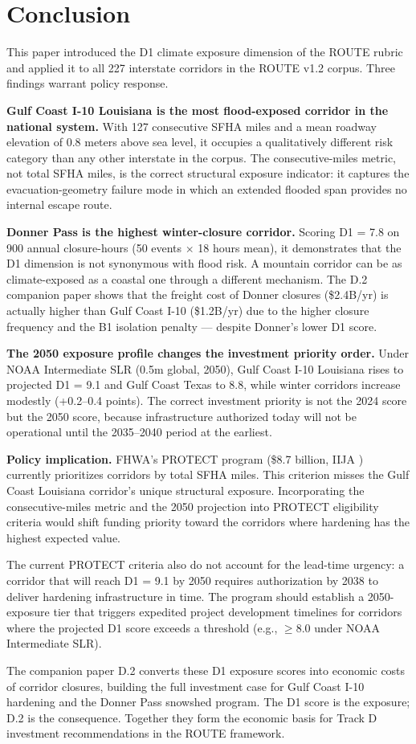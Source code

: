 \section{Conclusion}

This paper introduced the D1 climate exposure dimension of the ROUTE rubric and applied
it to all 227 interstate corridors in the ROUTE v1.2 corpus. Three findings warrant
policy response.

\textbf{Gulf Coast I-10 Louisiana is the most flood-exposed corridor in the national
system.} With 127 consecutive SFHA miles and a mean roadway elevation of 0.8 meters
above sea level, it occupies a qualitatively different risk category than any other
interstate in the corpus. The consecutive-miles metric, not total SFHA miles, is the
correct structural exposure indicator: it captures the evacuation-geometry failure mode
in which an extended flooded span provides no internal escape route.

\textbf{Donner Pass is the highest winter-closure corridor.} Scoring D1 = 7.8 on 900
annual closure-hours (50 events $\times$ 18 hours mean), it demonstrates that the D1
dimension is not synonymous with flood risk. A mountain corridor can be as climate-exposed
as a coastal one through a different mechanism. The D.2 companion paper shows that the
freight cost of Donner closures (\$2.4B/yr) is actually higher than Gulf Coast I-10
(\$1.2B/yr) due to the higher closure frequency and the B1 isolation penalty --- despite
Donner's lower D1 score.

\textbf{The 2050 exposure profile changes the investment priority order.} Under NOAA
Intermediate SLR (0.5m global, 2050), Gulf Coast I-10 Louisiana rises to projected D1 =
9.1 and Gulf Coast Texas to 8.8, while winter corridors increase modestly (+0.2--0.4
points). The correct investment priority is not the 2024 score but the 2050 score, because
infrastructure authorized today will not be operational until the 2035--2040 period at
the earliest.

\textbf{Policy implication.} FHWA's PROTECT program (\$8.7 billion, IIJA \citep{IIJA2021})
currently prioritizes corridors by total SFHA miles. This criterion misses the Gulf Coast
Louisiana corridor's unique structural exposure. Incorporating the consecutive-miles metric
and the 2050 projection into PROTECT eligibility criteria would shift funding priority
toward the corridors where hardening has the highest expected value.

The current PROTECT criteria also do not account for the lead-time urgency: a corridor
that will reach D1 = 9.1 by 2050 requires authorization by 2038 to deliver hardening
infrastructure in time. The program should establish a 2050-exposure tier that triggers
expedited project development timelines for corridors where the projected D1 score exceeds
a threshold (e.g., $\geq 8.0$ under NOAA Intermediate SLR).

The companion paper D.2 \citep{ROUTE_D2} converts these D1 exposure scores into economic
costs of corridor closures, building the full investment case for Gulf Coast I-10 hardening
and the Donner Pass snowshed program. The D1 score is the exposure; D.2 is the consequence.
Together they form the economic basis for Track D investment recommendations in the ROUTE
framework.
